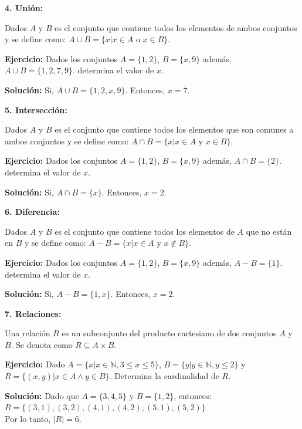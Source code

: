 \documentclass[11pt, a4paper]{article}
\begin{document}
\begin{multicols}{2}
    \begin{center}
      \textbf{4. Unión:}
    \end{center}
    Dados \( A \) y \( B \) es el conjunto que contiene todos los elementos de ambos conjuntos y se define como: \( A \cup B = \{x | x \in A \text{ o } x \in B\} \).
    
    \textbf{Ejercicio:} Dados los conjuntos \( A = \{1, 2\} \), \( B = \{x, 9\} \) además, \( A \cup B = \{1, 2, 7, 9\} \). determina el valor de $x$.
    
    \textbf{Solución:} Si, \( A \cup B = \{1, 2, x, 9\} \). Entonces, \( x = 7 \).

    \begin{center}
      \textbf{5. Intersección:}
    \end{center}
    Dados \( A \) y \( B \) es el conjunto que contiene todos los elementos que son comunes a ambos conjuntos y se define como: \( A \cap B = \{x | x \in A \text{ y } x \in B\} \).
    
    \textbf{Ejercicio:} Dados los conjuntos \( A = \{1, 2\} \), \( B = \{x, 9\} \) además, \( A \cap B = \{2\} \). determina el valor de $x$.
    
    \textbf{Solución:} Si, \( A \cap B = \{x\} \). Entonces, \( x = 2 \).

    \begin{center}
      \textbf{6. Diferencia:}
    \end{center}
    Dados \( A \) y \( B \) es el conjunto que contiene todos los elementos de \( A \) que no están en \( B \) y se define como: \( A - B = \{x | x \in A \text{ y } x \notin B\} \).
    
    \textbf{Ejercicio:} Dados los conjuntos \( A = \{1, 2\} \), \( B = \{x, 9\} \) además, \( A - B = \{1\} \). determina el valor de $x$.
    
    \textbf{Solución:} Si, \( A - B = \{1, x\} \). Entonces, \( x = 2 \).

    \begin{center}
      \textbf{7. Relaciones:}
    \end{center}
    Una relación $R$ es un subconjunto del producto cartesiano de dos conjuntos $A$ y $B$. Se denota como $R \subseteq A \times B$.
    
    \textbf{Ejercicio:} Dado $A = \{x | x \in \mathbb{N}, 3 \leq x \leq 5\}$, $B = \{y | y \in \mathbb{N}, y \leq 2\}$ y $R = \{(x, y) | x \in A \land y \in B\}$. Determina la cardinalidad de $R$.
    
    \textbf{Solución:} \sloppy Dado que $A = \{3, 4, 5\}$ y $B = \{1, 2\}$, entonces: \\ 
    $R = \{(3, 1), (3, 2), (4, 1), (4, 2), (5, 1), (5, 2)\}$ \\ 
    Por lo tanto, $|R| = 6$.


\end{multicols}
\end{document}
